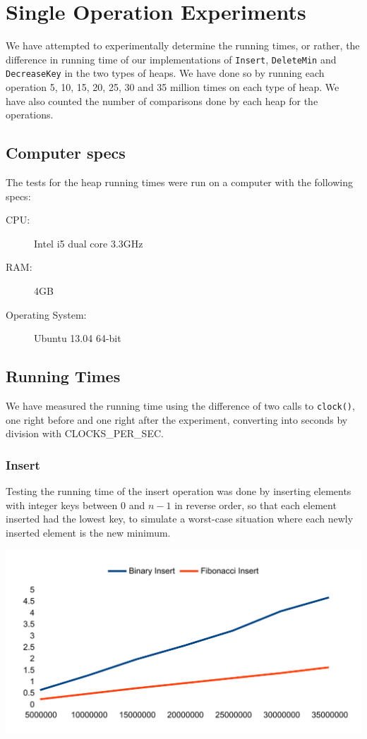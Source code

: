 \section{Single Operation Experiments}
We have attempted to experimentally determine the running times, or rather, the difference in running time of our implementations of \verb#Insert#, \verb#DeleteMin# and \verb#DecreaseKey# in the two types of heaps. We have done so by running each operation 5, 10, 15, 20, 25, 30 and 35 million times on each type of heap. We have also counted the number of comparisons done by each heap for the operations.

\subsection{Computer specs}
The tests for the heap running times were run on a computer with the following specs:

\begin{description}
\item[CPU:] Intel i5 dual core 3.3GHz
\item[RAM:] 4GB
\item[Operating System:] Ubuntu 13.04 64-bit 
\end{description}

\subsection{Running Times}
We have measured the running time using the difference of two calls to \verb#clock()#, one right before and one right after the experiment, converting into seconds by division with CLOCKS\_PER\_SEC.

\subsubsection{Insert}
Testing the running time of the insert operation was done by inserting elements with integer keys between $0$ and $n-1$ in reverse order, so that each element inserted had the lowest key, to simulate a worst-case situation where each newly inserted element is the new minimum.

\includegraphics[width=\textwidth]{graphs/insert_graph.pdf}

